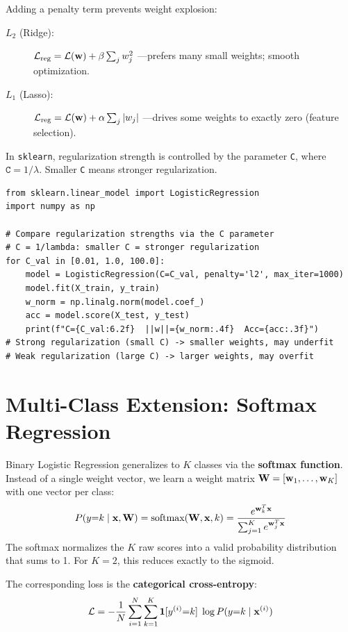 Adding a penalty term prevents weight explosion:
\begin{description}
    \item[$L_2$ (Ridge):] $\mathcal{L}_{\text{reg}} = \mathcal{L}(\mathbf{w}) + \beta\sum_j w_j^2$ \quad---\quad prefers many small weights; smooth optimization.
    \item[$L_1$ (Lasso):] $\mathcal{L}_{\text{reg}} = \mathcal{L}(\mathbf{w}) + \alpha\sum_j |w_j|$ \quad---\quad drives some weights to exactly zero (feature selection).
\end{description}

In \texttt{sklearn}, regularization strength is controlled by the parameter \texttt{C}, where $\texttt{C} = 1/\lambda$. Smaller \texttt{C} means stronger regularization.

\begin{lstlisting}[style=pythonstyle]
from sklearn.linear_model import LogisticRegression
import numpy as np

# Compare regularization strengths via the C parameter
# C = 1/lambda: smaller C = stronger regularization
for C_val in [0.01, 1.0, 100.0]:
    model = LogisticRegression(C=C_val, penalty='l2', max_iter=1000)
    model.fit(X_train, y_train)
    w_norm = np.linalg.norm(model.coef_)
    acc = model.score(X_test, y_test)
    print(f"C={C_val:6.2f}  ||w||={w_norm:.4f}  Acc={acc:.3f}")
# Strong regularization (small C) -> smaller weights, may underfit
# Weak regularization (large C) -> larger weights, may overfit
\end{lstlisting}

\section*{Multi-Class Extension: Softmax Regression}

Binary Logistic Regression generalizes to $K$ classes via the \textbf{softmax function}. Instead of a single weight vector, we learn a weight matrix $\mathbf{W} = [\mathbf{w}_1, \dots, \mathbf{w}_K]$ with one vector per class:
$$P(y{=}k \mid \mathbf{x}, \mathbf{W}) = \text{softmax}(\mathbf{W}, \mathbf{x}, k) = \frac{e^{\mathbf{w}_k^T\mathbf{x}}}{\sum_{j=1}^{K} e^{\mathbf{w}_j^T\mathbf{x}}}$$
The softmax normalizes the $K$ raw scores into a valid probability distribution that sums to 1. For $K{=}2$, this reduces exactly to the sigmoid.

The corresponding loss is the \textbf{categorical cross-entropy}:
$$\mathcal{L} = -\frac{1}{N}\sum_{i=1}^{N}\sum_{k=1}^{K}\mathbf{1}[y^{(i)}{=}k]\;\log P(y{=}k \mid \mathbf{x}^{(i)})$$

